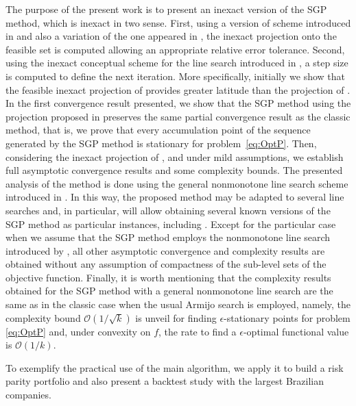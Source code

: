 The purpose of the present  work is to present an inexact version of the SGP method, which  is inexact in two sense. First,  using  a version of  scheme introduced in \cite{BirginMartinezRaydan2003} and also a variation of the one appeared in \cite[Example 1]{VillaSalzo2013},  the inexact projection  onto the feasible  set is computed  allowing an appropriate  relative error tolerance. Second,  using the inexact  conceptual scheme for the  line search  introduced  in  \cite{GrapigliaSachs2020, SachsSachs2011}, a step size is computed  to define the next iteration.   More specifically, initially we show that the  feasible inexact  projection of \cite{BirginMartinezRaydan2003} provides greater latitude than the projection of \cite[Example 1]{VillaSalzo2013}.  In the first  convergence result presented, we show that the SGP method using the projection proposed in \cite{BirginMartinezRaydan2003} preserves the same partial convergence result as the classic method, that is, we prove that every accumulation point  of the sequence generated by the SGP method is stationary for problem~\eqref{eq:OptP}. Then, considering the inexact projection of \cite[Example 1]{VillaSalzo2013}, and  under mild  assumptions,  we establish  full asymptotic convergence results  and  some complexity bounds. The  presented analysis of the method is done using the general  nonmonotone line search scheme  introduced in \cite{GrapigliaSachs2020}. In this way, the proposed method may be adapted to several line searches and, in particular, will allow obtaining several known versions of the SGP method as particular instances,  including  \cite{yunier_roman2010,BirginMartinezRaydan2003,Iusem2003,Xihong2018}. Except for the particular case when we assume that the SGP method employs  the nonmonotone line search introduced by \cite{Grippo1986}, all other  asymptotic convergence and complexity  results are obtained without any assumption of compactness of the sub-level sets of the objective function.  Finally, it is worth mentioning that the complexity results obtained  for the SGP method with a general nonmonotone line search  are the same as in the classic case when the usual Armijo search is employed, namely,  the complexity bound  $\mathcal{O}(1/\sqrt{k})$ is unveil for finding $\epsilon$-stationary points for problem \eqref{eq:OptP} and, under convexity on $f$, the rate to find a $\epsilon$-optimal functional value is $\mathcal{O}(1/k)$.

To exemplify the practical use of the main algorithm, we apply it to build a risk parity portfolio and also present a backtest study with the largest Brazilian companies.

